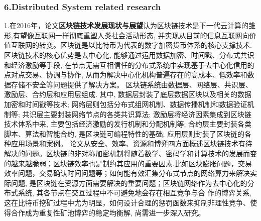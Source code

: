 \documentclass[a4paper,twoside]{scrbook}
\begin{document}
\begin{CJK}{UTF8}{gbsn}
\subsubsection{6.Distributed System related research}
1.在2016年，论文\textbf{区块链技术发展现状与展望}认为区块链技术是下一代云计算的雏形,有望像互联网一样彻底重塑人类社会活动形态, 并实现从目前的信息互联网向价值互联网的转变。区块链是以比特币为代表的数字加密货币体系的核心支撑技术. 区块链技术的核心优势是去中心化, 能够通过运用数据加密、时间戳、分布式共识和经济激励等手段, 在节点无需互相信任的分布式系统中实现基于去中心化信用的点对点交易、协调与协作, 从而为解决中心化机构普遍存在的高成本、低效率和数据存储不安全等问题提供了解决方案。
区块链系统由数据层、网络层、共识层、激励层、合约层和应用层组成. 其中, 数据层封装了底层数据区块以及相关的数据加密和时间戳等技术; 网络层则包括分布式组网机制、数据传播机制和数据验证机制等; 共识层主要封装网络节点的各类共识算法; 激励层将经济因素集成到区块链技术体系中来, 主要包括经济激励的发行机制和分配机制等; 合约层主要封装各类脚本、算法和智能合约, 是区块链可编程特性的基础; 应用层则封装了区块链的各种应用场景和案例。
论文从安全、效率、资源和博弈四方面概述区块链技术有待解决的问题。区块链的非对称加密机制将随着数学、密码学和计算技术的发展而变的越来越脆弱；区块链效率也是制约其应用的重要因素.比如区块膨胀问题，交易效率问题，交易确认时间问题等；如何能有效汇集分布式节点的网络算力来解决实际问题, 是区块链在资源方面需要解决的重要问题；区块链网络作为去中心化的分布式系统, 其各节点在交互过程中不可避免地会存在相互竞争与合
作的博弈关系, 这在比特币挖矿过程中尤为明显，如何设计合理的惩罚函数来抑制非理性竞争、使得合作成为重复性矿池博弈的稳定均衡解, 尚需进一步深入研究。


\end{CJK}
\end{document}
